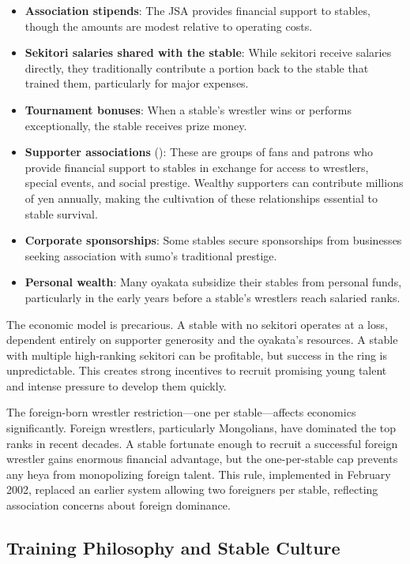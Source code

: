 \begin{itemize}
\item \textbf{Association stipends}: The JSA provides financial support to stables, though the amounts are modest relative to operating costs.
\item \textbf{Sekitori salaries shared with the stable}: While sekitori receive salaries directly, they traditionally contribute a portion back to the stable that trained them, particularly for major expenses.
\item \textbf{Tournament bonuses}: When a stable's wrestler wins or performs exceptionally, the stable receives prize money.
\item \textbf{Supporter associations} (): These are groups of fans and patrons who provide financial support to stables in exchange for access to wrestlers, special events, and social prestige. Wealthy supporters can contribute millions of yen annually, making the cultivation of these relationships essential to stable survival.
\item \textbf{Corporate sponsorships}: Some stables secure sponsorships from businesses seeking association with sumo's traditional prestige.
\item \textbf{Personal wealth}: Many oyakata subsidize their stables from personal funds, particularly in the early years before a stable's wrestlers reach salaried ranks.
\end{itemize}

The economic model is precarious. A stable with no sekitori operates at a loss, dependent entirely on supporter generosity and the oyakata's resources. A stable with multiple high-ranking sekitori can be profitable, but success in the ring is unpredictable. This creates strong incentives to recruit promising young talent and intense pressure to develop them quickly.

The foreign-born wrestler restriction—one per stable—affects economics significantly. Foreign wrestlers, particularly Mongolians, have dominated the top ranks in recent decades. A stable fortunate enough to recruit a successful foreign wrestler gains enormous financial advantage, but the one-per-stable cap prevents any heya from monopolizing foreign talent. This rule, implemented in February 2002, replaced an earlier system allowing two foreigners per stable, reflecting association concerns about foreign dominance.

\subsection{Training Philosophy and Stable Culture}

